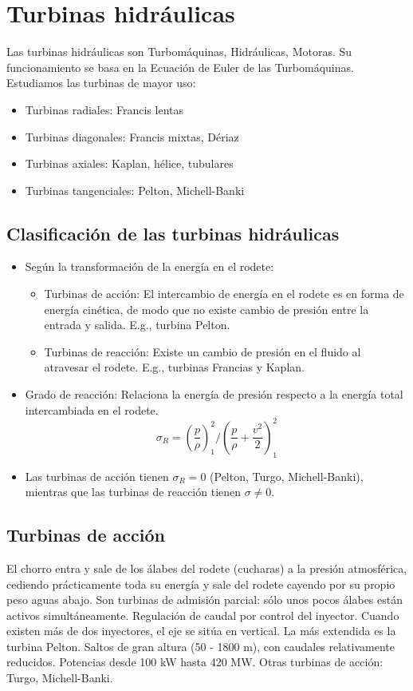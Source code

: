\section{Turbinas hidráulicas}
Las turbinas hidráulicas son Turbomáquinas, Hidráulicas, Motoras. Su funcionamiento se basa en la Ecuación de Euler de las Turbomáquinas. Estudiamos las turbinas de mayor uso:
\begin{itemize}
    \item Turbinas radiales: Francis lentas
    \item Turbinas diagonales: Francis mixtas, Dériaz
    \item Turbinas axiales: Kaplan, hélice, tubulares
    \item Turbinas tangenciales: Pelton, Michell-Banki
\end{itemize}

\subsection{Clasificación de las turbinas hidráulicas}
\begin{itemize}
    \item Según la transformación de la energía en el rodete:
    \begin{itemize}
        \item Turbinas de acción: El intercambio de energía en el rodete es en forma de energía cinética, de modo que no existe cambio de presión entre la entrada y salida. E.g., turbina Pelton.
        \item Turbinas de reacción: Existe un cambio de presión en el fluido al atravesar el rodete. E.g., turbinas Francias y Kaplan.
    \end{itemize}
    \item Grado de reacción: Relaciona la energía de presión respecto a la energía total intercambiada en el rodete.
    \[ \sigma_R = \left( \frac{p}{\rho} \right)^2_1 / \left( \frac{p}{\rho} + \frac{v^2}{2} \right)^2_1 \]
    \item Las turbinas de acción tienen $\sigma_R = 0$ (Pelton, Turgo, Michell-Banki), mientras que las turbinas de reacción tienen $\sigma \neq 0$.
\end{itemize}

\subsection{Turbinas de acción}
El chorro entra y sale de los álabes del rodete (cucharas) a la presión atmosférica, cediendo prácticamente toda su energía y sale del rodete cayendo por su propio peso aguas abajo. Son turbinas de admisión parcial: sólo unos pocos álabes están activos simultáneamente. Regulación de caudal por control del inyector. Cuando existen más de dos inyectores, el eje se sitúa en vertical. La más extendida es la turbina Pelton. Saltos de gran altura (50 - 1800 m), con caudales relativamente reducidos. Potencias desde 100 kW hasta 420 MW. Otras turbinas de acción: Turgo, Michell-Banki.

